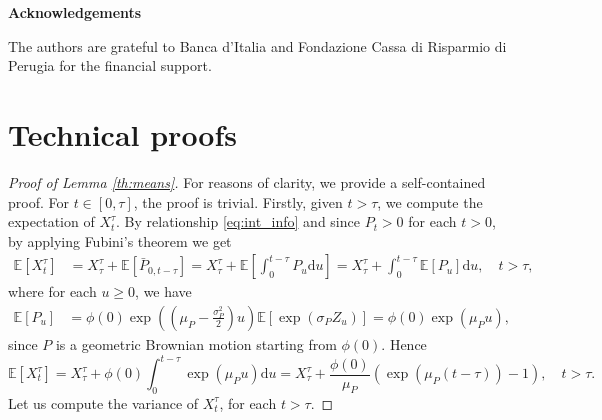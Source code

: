 \documentclass[12pt,centertags,reqno]{amsart}
\numberwithin{equation}{section} \makeatletter
\newcommand{\ud}{\mathrm d}
\newcommand{\esp}[2][\mathbb E] {#1\left[#2\right]}
\begin{document}
\medskip

 \begin{center}
{\bf Acknowledgements}
\end{center}
The authors are grateful to Banca d'Italia and Fondazione Cassa di Risparmio di Perugia for the financial support.






\appendix
\section{Technical proofs}\label{appendix:technical}

\begin{proof}[Proof of Lemma \ref{th:means}]
For reasons of clarity,  we provide a self-contained proof. %
For $t \in [0,\tau]$, the proof is trivial. 
Firstly, given $t > \tau$, we compute the expectation of $X_t^\tau$. %
By relationship \eqref{eq:int_info} and since $P_t >  0$ for each $t > 0$, by applying Fubini’s theorem we get
\begin{align*}
\esp{X_t^\tau} & = X_\tau^\tau + \esp{\bar P_{0,t-\tau}}= X_\tau^\tau + \esp{\int_0^{t-\tau} P_u \ud u}
= X_\tau^\tau + \int_0^{t-\tau} \esp{P_u} \ud u, \quad t > \tau,
\end{align*}
where %
for each $u \ge 0$, we have
\begin{align*}
\esp{P_{u}} & 
 = \phi(0)\exp\left(\left(\mu_{P}-\frac{\sigma_{P}^{2}}{2}\right)u\right)\esp{\exp\left(\sigma_{P}Z_{u}\right)} 
= \phi(0)\exp\left(\mu_{P}u\right),
\end{align*}
since $P$ is a geometric Brownian motion starting from $\phi(0)$.
Hence
$$
\esp{X_t^\tau}=X_\tau^\tau +\phi(0)\int_{0}^{t-\tau}\exp\left(\mu_{P}u\right) \ud u=X_\tau^\tau+\frac{\phi(0)}{\mu_{P}}\left(\exp\left(\mu_{P}(t-\tau)\right) -1\right), \quad t > \tau.
$$
Let us compute the variance of $X_t^\tau$, for each $t > \tau$. %

\end{proof}
\end{document}
